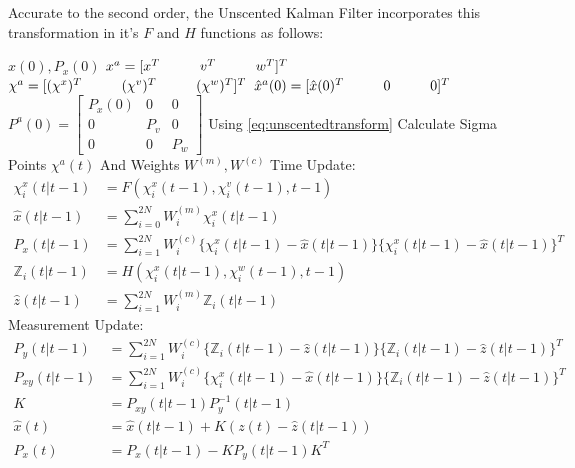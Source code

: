 \begin{appendices}
Accurate to the second order, the Unscented Kalman Filter incorporates this transformation in it's $F$ and $H$ functions as follows:

\begin{algorithmic}
\State {} $\hat{x}(0), P_{x}(0)$
\State {} $x^a = [x^T \hspace*{1cm} v^T \hspace*{1cm} w^T]^T$
\State {} $\chi^a = [(\chi^x)^T  \hspace*{1cm} (\chi^v)^T  \hspace*{1cm} (\chi^w)^T]^T$
\State {} $\hat{x}^a(0) = [\hat{x}(0)^T  \hspace*{1cm} 0  \hspace*{1cm} 0]^T$
\State {} $P^a(0) =
\begin{bmatrix}
	P_{x}(0) & 0 & 0\\
	0 & P_v & 0\\
	0 & 0 & P_w
\end{bmatrix}$ 
  \State Using \ref{eq:unscentedtransform} Calculate Sigma Points $\chi^a(t)$ And Weights $W^{(m)}, W^{(c)}$
  \State Time Update:
  \begin{align*}
  	\chi_i^x(t\vert t-1) &= F(\chi_i^x(t-1), \chi_i^v(t-1), t-1)\\
  	\hat{x}(t\vert t-1) &= \sum_{i=0}^{2N} W_i^{(m)}\chi_i^x(t\vert t-1)\\
  	P_{x}(t\vert t-1) &= \sum_{i=1}^{2N} W_i^{(c)} \{\chi_i^x(t\vert t-1) - \hat{x}(t\vert t-1)\}\{\chi_i^x(t\vert t-1) - \hat{x}(t\vert t-1)\}^T\\
  	\mathbb{Z}_i(t\vert t-1) &= H(\chi_i^x(t\vert t-1), \chi_i^w(t-1), t-1)\\
  	\hat{z}(t\vert t-1) &= \sum_{i=1}^{2N} W_i^{(m)}\mathbb{Z}_i(t\vert t-1)
  \end{align*}
  \State Measurement Update:
  \begin{align*}
  	P_{y}(t\vert t-1) &= \sum_{i=1}^{2N}W_i^{(c)}\{\mathbb{Z}_i(t\vert t-1) - \hat{z}(t\vert t-1)\}\{\mathbb{Z}_i(t\vert t-1) - \hat{z}(t\vert t-1)\}^T\\
  	P_{xy}(t\vert t-1) &= \sum_{i=1}^{2N}W_i^{(c)}\{\chi_i^x(t\vert t-1) - \hat{x}(t\vert t-1)\}\{\mathbb{Z}_i(t\vert t-1) - \hat{z}(t\vert t-1)\}^T\\
  	K &= P_{xy}(t\vert t-1)P^{-1}_{y}(t\vert t-1)\\
  	\hat{x}(t) &= \hat{x}(t\vert t-1) + K(z(t) - \hat{z}(t\vert t-1))\\
  	P_{x}(t) &= P_{x}(t\vert t-1) - KP_{y}(t\vert t-1)K^T
  \end{align*}
\End
\end{algorithmic}


\end{appendices}
